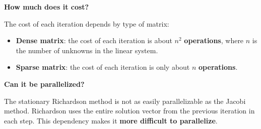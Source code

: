 \highspace
\begin{flushleft}
    \textcolor{Red2}{ \textbf{How much does it cost?}}
\end{flushleft}
The cost of each iteration depends by type of matrix:
\begin{itemize}
    \item \textbf{Dense matrix}: the cost of each iteration is about $n^{2}$ \textbf{operations}, where $n$ is the number of unknowns in the linear system.
    \item \textbf{Sparse matrix}: the cost of each iteration is only about $n$ \textbf{operations}.
\end{itemize}

\highspace
\begin{flushleft}
    \textcolor{Green3}{ \textbf{Can it be parallelized?}}
\end{flushleft}
The stationary Richardson method is not as easily parallelizable as the Jacobi method. Richardson uses the entire solution vector from the previous iteration in each step. This dependency makes it \textbf{more difficult to parallelize}.